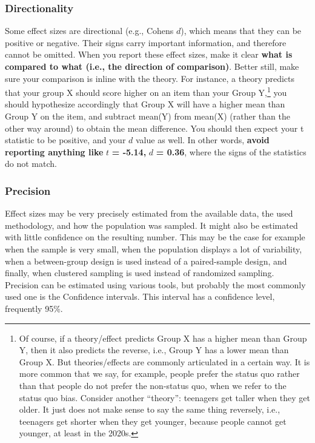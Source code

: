 \documentclass[
  man,
  colorlinks=true,linkcolor=blue,citecolor=blue,urlcolor=blue]{apa7}
\begin{document}
\hypertarget{directionality}{%
\subsubsection{Directionality}\label{directionality}}

Some effect sizes are directional (e.g., Cohen\textquotesingle s \(d\)),
which means that they can be positive or negative. Their signs carry
important information, and therefore cannot be omitted. When you report
these effect sizes, make it clear \textbf{what is compared to what
(i.e., the direction of comparison)}. Better still, make sure your
comparison is inline with the theory. For instance, a theory predicts
that your group X should score higher on an item than your Group
Y,\footnote{Of course, if a theory/effect predicts Group X has a higher
  mean than Group Y, then it also predicts the reverse, i.e., Group Y
  has a lower mean than Group X. But theories/effects are commonly
  articulated in a certain way. It is more common that we say, for
  example, people prefer the status quo rather than that people do not
  prefer the non-status quo, when we refer to the status quo bias.
  Consider another ``theory'': teenagers get taller when they get older.
  It just does not make sense to say the same thing reversely, i.e.,
  teenagers get shorter when they get younger, because people cannot get
  younger, at least in the 2020s.} you should hypothesize accordingly
that Group X will have a higher mean than Group Y on the item, and
subtract mean(Y) from mean(X) (rather than the other way around) to
obtain the mean difference. You should then expect your t statistic to
be positive, and your \(d\) value as well. In other words, \textbf{avoid
reporting anything like} \(t\) \textbf{= -5.14,} \(d\) \textbf{= 0.36},
where the signs of the statistics do not match.

\hypertarget{precision}{%
\subsubsection{Precision}\label{precision}}

Effect sizes may be very precisely estimated from the available data,
the used methodology, and how the population was sampled. It might also
be estimated with little confidence on the resulting number. This may be
the case for example when the sample is very small, when the population
displays a lot of variability, when a between-group design is used
instead of a paired-sample design, and finally, when clustered sampling
is used instead of randomized sampling. Precision can be estimated using
various tools, but probably the most commonly used one is the Confidence
intervals. This interval has a confidence level, frequently 95\%.
\end{document}
